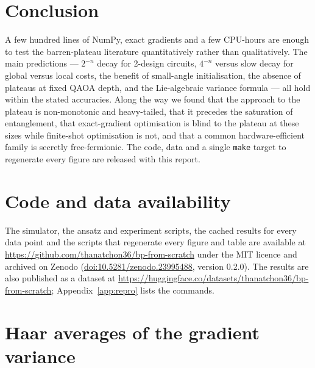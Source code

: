 \documentclass[11pt]{article}
\begin{document}
\section{Conclusion}

A few hundred lines of NumPy, exact gradients and a few CPU-hours are enough to test the barren-plateau literature quantitatively rather than qualitatively. The main predictions --- $2^{-n}$ decay for 2-design circuits, $4^{-n}$ versus slow decay for global versus local costs, the benefit of small-angle initialisation, the absence of plateaus at fixed QAOA depth, and the Lie-algebraic variance formula --- all hold within the stated accuracies. Along the way we found that the approach to the plateau is non-monotonic and heavy-tailed, that it precedes the saturation of entanglement, that exact-gradient optimisation is blind to the plateau at these sizes while finite-shot optimisation is not, and that a common hardware-efficient family is secretly free-fermionic. The code, data and a single \texttt{make} target to regenerate every figure are released with this report.

\section*{Code and data availability}
The simulator, the ansatz and experiment scripts, the cached results for every data point and the scripts that regenerate every figure and table are available at \url{https://github.com/thanatchon36/bp-from-scratch} under the MIT licence and archived on Zenodo (\href{https://doi.org/10.5281/zenodo.23995488}{doi:10.5281/zenodo.23995488}, version 0.2.0). The results are also published as a dataset at \url{https://huggingface.co/datasets/thanatchon36/bp-from-scratch}; Appendix~\ref{app:repro} lists the commands.

\appendix

\section{Haar averages of the gradient variance}
\label{app:haar}
\end{document}
